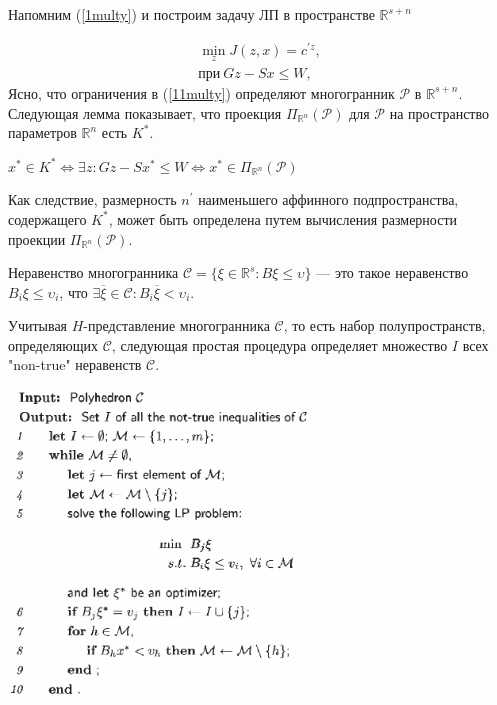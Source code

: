 Напомним (\ref{1multy}) и построим задачу ЛП в пространстве $\mathbb{R}^{s + n}$

\begin{equation}\label{11multy}
    \begin{split}
        \min_z J(z,x) = c^{'z},\\
        \text{при}\ Gz - Sx \leq W,
    \end{split}
\end{equation}
Ясно, что ограничения в (\ref{11multy}) определяют многогранник $\mathcal{P}$ в $\mathbb{R}^{s + n}$. Следующая лемма показывает, что проекция ${\Pi_{\mathbb{R}^{n}}}(\mathcal{P})$ для $\mathcal{P}$ на пространство параметров $\mathbb{R}^{n}$ есть $K^*$.

\begin{lemma}\label{lemma}
    $x^* \in K^* \Longleftrightarrow \exists z : Gz - Sx^{*} \leq W \Longleftrightarrow x^* \in \Pi_{\mathbb{R}^{n}} (\mathcal{P})$

    Как следствие, размерность $n^{'}$ наименьшего аффинного подпространства, содержащего $K^*$, может быть определена путем вычисления размерности проекции $\Pi_{\mathbb{R}^{n}} (\mathcal{P})$.
\end{lemma}


\begin{definition}
    Неравенство многогранника $\mathcal{C} = \{\xi \in \mathbb{R}^s: B\xi \leq \upsilon\}$ --- это такое неравенство $B_{i}\xi \leq \upsilon_{i}$, что $\exists \overline{\xi} \in \mathcal{C}: B_{i}\overline{\xi} < \upsilon_{i}$.
\end{definition}

Учитывая $H$-представление многогранника $\mathcal{C}$, то есть набор полупространств, определяющих $\mathcal{C}$, следующая простая процедура определяет множество $I$ всех "non-true" неравенств $\mathcal{C}$.

\begin{algorithm}[H]
    \SetAlgoLined
    \includegraphics[width=0.6\textwidth]{algorythm1.eps}
     \caption{}
\end{algorithm}

